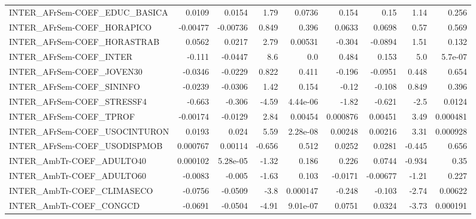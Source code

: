 \begin{tabular}{lrrrrrrrr}
INTER\_AFrSem-COEF\_EDUC\_BASICA         &      0.0109 &       0.0154 &    1.79 &   0.0736 &      0.154 &        0.15 &         1.14 &         0.256 \\
INTER\_AFrSem-COEF\_HORAPICO            &    -0.00477 &     -0.00736 &   0.849 &    0.396 &     0.0633 &      0.0698 &         0.57 &         0.569 \\
INTER\_AFrSem-COEF\_HORASTRAB           &      0.0562 &       0.0217 &    2.79 &  0.00531 &     -0.304 &     -0.0894 &         1.51 &         0.132 \\
INTER\_AFrSem-COEF\_INTER               &      -0.111 &      -0.0447 &     8.6 &      0.0 &      0.484 &       0.153 &          5.0 &       5.7e-07 \\
INTER\_AFrSem-COEF\_JOVEN30             &     -0.0346 &      -0.0229 &   0.822 &    0.411 &     -0.196 &     -0.0951 &        0.448 &         0.654 \\
INTER\_AFrSem-COEF\_SININFO             &     -0.0239 &      -0.0306 &    1.42 &    0.154 &      -0.12 &      -0.108 &        0.849 &         0.396 \\
INTER\_AFrSem-COEF\_STRESSF4            &      -0.663 &       -0.306 &   -4.59 & 4.44e-06 &      -1.82 &      -0.621 &         -2.5 &        0.0124 \\
INTER\_AFrSem-COEF\_TPROF               &    -0.00174 &      -0.0129 &    2.84 &  0.00454 &   0.000876 &     0.00451 &         3.49 &      0.000481 \\
INTER\_AFrSem-COEF\_USOCINTURON         &      0.0193 &        0.024 &    5.59 & 2.28e-08 &    0.00248 &     0.00216 &         3.31 &      0.000928 \\
INTER\_AFrSem-COEF\_USODISPMOB          &    0.000767 &      0.00114 &  -0.656 &    0.512 &     0.0252 &      0.0281 &       -0.445 &         0.656 \\
INTER\_AmbTr-COEF\_ADULTO40             &    0.000102 &     5.28e-05 &   -1.32 &    0.186 &      0.226 &      0.0744 &       -0.934 &          0.35 \\
INTER\_AmbTr-COEF\_ADULTO60             &     -0.0083 &       -0.005 &   -1.63 &    0.103 &    -0.0171 &    -0.00677 &        -1.21 &         0.227 \\
INTER\_AmbTr-COEF\_CLIMASECO            &     -0.0756 &      -0.0509 &    -3.8 & 0.000147 &     -0.248 &      -0.103 &        -2.74 &       0.00622 \\
INTER\_AmbTr-COEF\_CONGCD               &     -0.0691 &      -0.0504 &   -4.91 & 9.01e-07 &     0.0751 &      0.0324 &        -3.73 &      0.000191 \\

\end{tabular}
